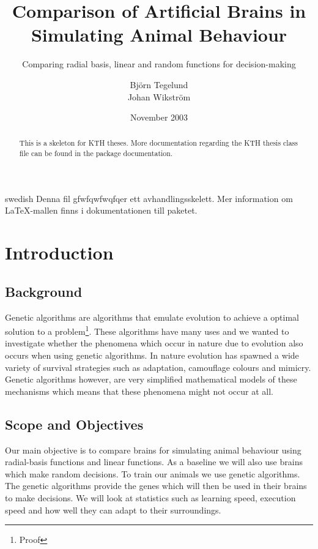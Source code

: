 \documentclass[a4paper,11pt]{kth-mag}
\title{Comparison of Artificial Brains in Simulating Animal Behaviour}
\subtitle{Comparing radial basis, linear and random functions for decision-making}
\author{Björn Tegelund\\Johan Wikström}
\date{November 2003}
\begin{document}
\frontmatter
\pagestyle{empty}
\removepagenumbers
\maketitle
{}
\begin{abstract}
  This is a skeleton for KTH theses. More documentation
  regarding the KTH thesis class file can be found in
  the package documentation.

\end{abstract}
\clearpage
\begin{foreignabstract}{swedish}
  Denna fil gfwfqwfwqfqer ett avhandlingsskelett.
  Mer information om \LaTeX-mallen finns i
  dokumentationen till paketet.

\end{foreignabstract}
\clearpage
\tableofcontents*
\mainmatter
\pagestyle{newchap}
\chapter{Introduction}

\section{Background}

Genetic algorithms are algorithms that emulate evolution to achieve a optimal solution to a problem\footnote[1]{Proof}. 
These algorithms have many uses and we wanted to investigate whether the phenomena which occur in nature
due to evolution also occurs when using genetic algorithms. In nature evolution has spawned a wide variety
of survival strategies such as adaptation, camouflage colours and mimicry. Genetic algorithms however, are 
very simplified mathematical models of these mechanisms which means that these phenomena might not occur 
at all.

\section{Scope and Objectives}

Our main objective is to compare brains for simulating animal behaviour using radial-basis functions and linear functions. As a baseline we will also use brains which make random decisions. To train our animals we use genetic algorithms. The genetic algorithms provide the genes which will then be used in their brains to make decisions. We will look at statistics such as learning speed, execution speed and how well they can adapt to their surroundings.
\end{document}
